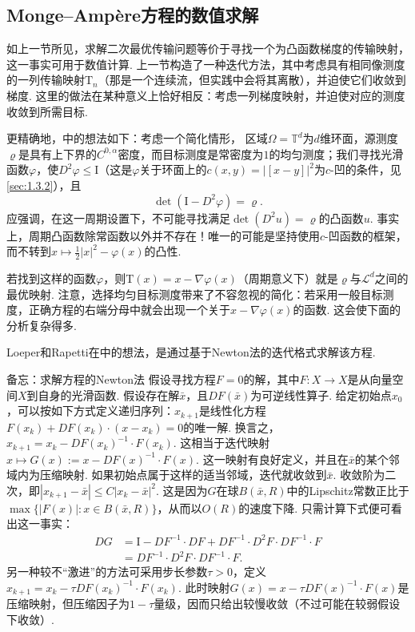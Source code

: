 \subsection{Monge--Ampère方程的数值求解}\label{sec:6.3}
如上一节所见，求解二次最优传输问题等价于寻找一个为凸函数梯度的传输映射，这一事实可用于数值计算. 上一节构造了一种迭代方法，其中考虑具有相同像测度的一列传输映射$\mathrm T_n$（那是一个连续流，但实践中会将其离散），并迫使它们收敛到梯度. 这里的做法在某种意义上恰好相反：考虑一列梯度映射，并迫使对应的测度收敛到所需目标.

更精确地，\cite{b217}中的想法如下：考虑一个简化情形，\label{idx:i148-p232}
区域$\Omega=\mathbb T^d$为$d$维环面，源测度$\varrho$是具有上下界的$C^{0,\alpha}$密度，而目标测度是常密度为$1$的均匀测度；我们寻找光滑函数$\varphi$，使$D^2\varphi\le\mathrm I$（这是$\varphi$关于环面上的$c(x,y)=|[x-y]|^2$为$c$-凹的条件，见\autoref{sec:1.3.2}），且
\[
\det(\mathrm I-D^2\varphi)=\varrho.
\]
应强调，在这一周期设置下，不可能寻找满足$\det(D^2u)=\varrho$的凸函数$u$. 事实上，周期凸函数除常函数以外并不存在！唯一的可能是坚持使用$c$-凹函数的框架，而不转到$x\mapsto\frac12|x|^2-\varphi(x)$的凸性.

若找到这样的函数$\varphi$，则$\mathrm T(x)=x-\nabla\varphi(x)$（周期意义下）就是$\varrho$与$\mathscr L^d$之间的最优映射. 注意，选择均匀目标测度带来了不容忽视的简化：若采用一般目标测度，正确方程的右端分母中就会出现一个关于$x-\nabla\varphi(x)$的函数. 这会使下面的分析复杂得多.

Loeper和Rapetti在\cite{b217}中的想法，是通过基于Newton法的迭代格式求解该方程.

\begin{sourcebox}{备忘：求解方程的Newton法}\label{box:6.4}
假设寻找方程$F=0$的解，其中$F:X\to X$是从向量空间$X$到自身的光滑函数. 假设存在解$\bar x$，且$DF(\bar x)$为可逆线性算子. 给定初始点$x_0$，可以按如下方式定义递归序列：$x_{k+1}$是线性化方程$F(x_k)+DF(x_k)\cdot(x-x_k)=0$的唯一解. 换言之，$x_{k+1}=x_k-DF(x_k)^{-1}\cdot F(x_k)$. 这相当于迭代映射$x\mapsto G(x):=x-DF(x)^{-1}\cdot F(x)$. 这一映射有良好定义，并且在$\bar x$的某个邻域内为压缩映射. 如果初始点属于这样的适当邻域，迭代就收敛到$\bar x$. 收敛阶为二次，即$|x_{k+1}-\bar x|\le C|x_k-\bar x|^2$. 这是因为$G$在球$B(\bar x,R)$中的Lipschitz常数正比于$\max\{|F(x)|:x\in B(\bar x,R)\}$，从而以$O(R)$的速度下降. 只需计算下式便可看出这一事实：
\[
\begin{aligned}
DG&=\mathrm I-DF^{-1}\cdot DF+
DF^{-1}\cdot D^2F\cdot DF^{-1}\cdot F\\
&=DF^{-1}\cdot D^2F\cdot DF^{-1}\cdot F.
\end{aligned}
\]
另一种较不“激进”的方法可采用步长参数$\tau>0$，定义$x_{k+1}=x_k-\tau DF(x_k)^{-1}\cdot F(x_k)$. 此时映射$G(x)=x-\tau DF(x)^{-1}\cdot F(x)$是压缩映射，但压缩因子为$1-\tau$量级，因而只给出较慢收敛（不过可能在较弱假设下收敛）.
\end{sourcebox}

